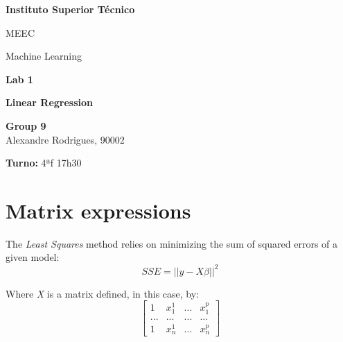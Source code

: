 \documentclass[a4paper,2pt]{report}
\begin{document}
\begin{titlepage}
    \begin{center}
        \vspace*{3cm}
 
        \LARGE
        \textbf{Instituto Superior Técnico}
        \vskip 0.4cm
 
        \Large{MEEC}
        \vskip 0.2cm

        \Large{Machine Learning}
        \vskip 3cm
        

 
        \Huge{\textbf{Lab 1}}
        \vskip 0.5cm

        \huge{\textbf{Linear Regression}}
        \vskip 0.5cm

 
        \vfill
 
        \large
        \textbf{Group 9}\\
        \vspace{0.3cm}
        Alexandre Rodrigues, 90002\\
        
        \vspace{1cm}

        \textbf{Turno:} 4ªf 17h30

    \end{center}
\end{titlepage}

\tableofcontents
\newpage

\setcounter{chapter}{1}
\section{Matrix expressions}

    \par The \textit{Least Squares} method relies on minimizing the sum of squared errors of a given model:
    \begin{equation}
        \textit{SSE} = ||y - X\beta||^2
    \end{equation}

    \par Where \textit{X} is a matrix defined, in this case, by:
    \begin{equation}
        \begin{bmatrix}
            1 & x_1^1 & \textit{...} & x_1^p\\
            \textit{...} & \textit{...} & \textit{...} & \textit{...}\\
            1 & x_n^1 & \textit{...} & x_n^p
        \end{bmatrix}
    \end{equation}
\end{document}
